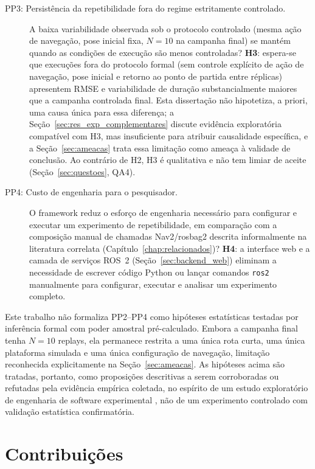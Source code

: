 \begin{description}
    \item[PP3: Persistência da repetibilidade fora do regime estritamente
    controlado.] A baixa variabilidade observada sob o protocolo controlado
    (mesma ação de navegação, pose inicial fixa, $N=10$ na campanha final) se
    mantém quando as condições de execução são menos controladas?
    \textbf{H3}: espera-se que execuções fora do protocolo formal (sem
    controle explícito de ação de navegação, pose inicial e retorno ao ponto
    de partida entre réplicas) apresentem RMSE e variabilidade de duração
    substancialmente maiores que a campanha controlada final. Esta dissertação não
    hipotetiza, a priori, uma causa única para essa diferença; a Seção~\ref{sec:res_exp_complementares} discute evidência exploratória
    compatível com H3, mas insuficiente para atribuir causalidade específica,
    e a Seção~\ref{sec:ameacas} trata essa limitação como ameaça à validade
    de conclusão. Ao contrário de H2, H3 é qualitativa e não tem limiar de
    aceite (Seção~\ref{sec:questoes}, QA4).

    \item[PP4: Custo de engenharia para o pesquisador.] O framework reduz
    o esforço de engenharia necessário para configurar e executar um
    experimento de repetibilidade, em comparação com a composição manual de
    chamadas Nav2/rosbag2 descrita informalmente na literatura correlata
    (Capítulo~\ref{chap:relacionados})?
    \textbf{H4}: a interface web e a camada de serviços ROS~2
    (Seção~\ref{sec:backend_web}) eliminam a necessidade de escrever código
    Python ou lançar comandos \texttt{ros2} manualmente para configurar,
    executar e analisar um experimento completo.
\end{description}

Este trabalho não formaliza PP2--PP4 como hipóteses estatísticas testadas por
inferência formal com poder amostral pré-calculado. Embora a campanha final
tenha $N=10$ replays, ela permanece restrita a uma única rota curta, uma única
plataforma simulada e uma única configuração de navegação, limitação reconhecida
explicitamente na Seção~\ref{sec:ameacas}. As hipóteses acima são tratadas,
portanto, como proposições descritivas a serem corroboradas ou refutadas pela
evidência empírica coletada, no espírito de um estudo exploratório de engenharia
de software experimental \cite{amigoni2010,runeson2009,wohlin2012}, não de um experimento controlado
com validação estatística confirmatória.

\section{Contribuições}
\label{sec:contribuicoes}


